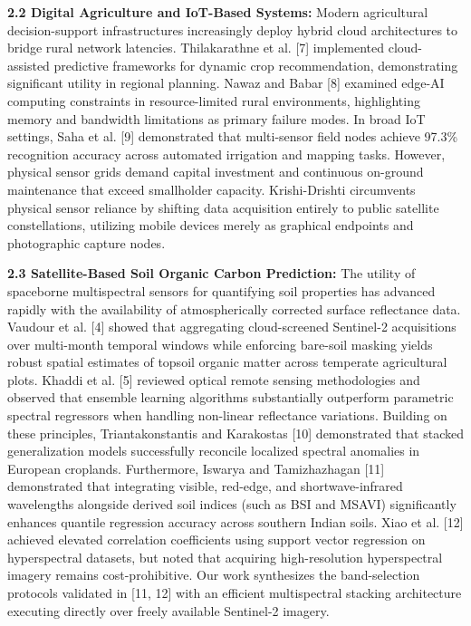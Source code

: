 \documentclass[11pt,a4paper]{article}
\begin{document}
\noindent \textbf{2.2 Digital Agriculture and IoT-Based Systems:} 
Modern agricultural decision-support infrastructures increasingly deploy hybrid cloud architectures to bridge rural network latencies. Thilakarathne et al. [7] implemented cloud-assisted predictive frameworks for dynamic crop recommendation, demonstrating significant utility in regional planning. Nawaz and Babar [8] examined edge-AI computing constraints in resource-limited rural environments, highlighting memory and bandwidth limitations as primary failure modes. In broad IoT settings, Saha et al. [9] demonstrated that multi-sensor field nodes achieve 97.3\% recognition accuracy across automated irrigation and mapping tasks. However, physical sensor grids demand capital investment and continuous on-ground maintenance that exceed smallholder capacity. Krishi-Drishti circumvents physical sensor reliance by shifting data acquisition entirely to public satellite constellations, utilizing mobile devices merely as graphical endpoints and photographic capture nodes.

\noindent \textbf{2.3 Satellite-Based Soil Organic Carbon Prediction:} 
The utility of spaceborne multispectral sensors for quantifying soil properties has advanced rapidly with the availability of atmospherically corrected surface reflectance data. Vaudour et al. [4] showed that aggregating cloud-screened Sentinel-2 acquisitions over multi-month temporal windows while enforcing bare-soil masking yields robust spatial estimates of topsoil organic matter across temperate agricultural plots. Khaddi et al. [5] reviewed optical remote sensing methodologies and observed that ensemble learning algorithms substantially outperform parametric spectral regressors when handling non-linear reflectance variations. Building on these principles, Triantakonstantis and Karakostas [10] demonstrated that stacked generalization models successfully reconcile localized spectral anomalies in European croplands. Furthermore, Iswarya and Tamizhazhagan [11] demonstrated that integrating visible, red-edge, and shortwave-infrared wavelengths alongside derived soil indices (such as BSI and MSAVI) significantly enhances quantile regression accuracy across southern Indian soils. Xiao et al. [12] achieved elevated correlation coefficients using support vector regression on hyperspectral datasets, but noted that acquiring high-resolution hyperspectral imagery remains cost-prohibitive. Our work synthesizes the band-selection protocols validated in [11, 12] with an efficient multispectral stacking architecture executing directly over freely available Sentinel-2 imagery.
\end{document}
